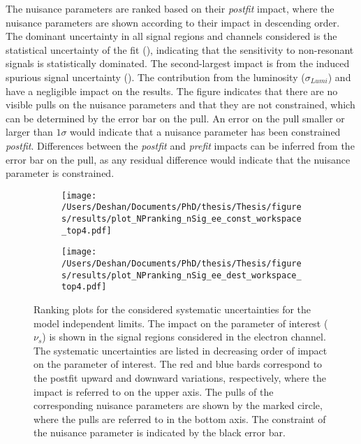 The nuisance parameters are ranked based on their \emph{postfit} impact, where the nuisance parameters are shown according to their impact in descending order. The dominant uncertainty in all signal regions and channels considered is the statistical uncertainty of the fit (\STATU), indicating that the sensitivity to non-resonant signals is statistically dominated. The second-largest impact is from the induced spurious signal uncertainty (\ISSU). The contribution from the luminosity ($\sigma_{Lumi}$) and \CRBU have a negligible impact on the results. The figure indicates that there are no visible pulls on the nuisance parameters and that they are not constrained, which can be determined by the error bar on the pull. An error on the pull smaller or larger than $1\sigma$ would indicate that a nuisance parameter has been constrained \emph{postfit}. Differences between the \emph{postfit} and \emph{prefit} impacts can be inferred from the error bar on the pull, as any residual difference would indicate that the nuisance parameter is constrained. 

\begin{figure}[!htpb]
    \centering
    \begin{subfigure}[b]{0.49\textwidth}
        \centering
        \texttt{[image: /Users/Deshan/Documents/PhD/thesis/Thesis/figures/results/plot\_NPranking\_nSig\_ee\_const\_workspace\_top4.pdf]}
        \label{fig:npranking1}
    \end{subfigure}
    \begin{subfigure}[b]{0.49\textwidth}
        \centering
        \texttt{[image: /Users/Deshan/Documents/PhD/thesis/Thesis/figures/results/plot\_NPranking\_nSig\_ee\_dest\_workspace\_top4.pdf]}
        \label{fig:npranking2}
    \end{subfigure}
    \caption[Ranking plots for the considered systematic uncertainties for the model independent limits in the electron channel signal regions]{Ranking plots for the considered systematic uncertainties for the model independent limits. The impact on the parameter of interest ($\nu_s$) is shown in the signal regions considered in the electron channel. The systematic uncertainties are listed in decreasing order of impact on the parameter of interest. The red and blue bards correspond to the postfit upward and downward variations, respectively, where the impact is referred to on the upper axis. The pulls of the corresponding nuisance parameters are shown by the marked circle, where the pulls are referred to in the bottom axis. The constraint of the nuisance parameter is indicated by the black error bar. 
    }
    \label{fig:nprankingee}
\end{figure}

